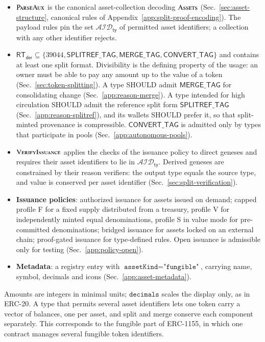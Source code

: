\begin{itemize}
	\item $\Call{ParseAux}{}$ is the canonical asset-collection decoding $\Call{Assets}{}$ (Sec.~\ref{sec:asset-structure}, canonical rules of Appendix~\ref{app:split-proof-encoding}). The payload rules pin the set $\mathcal{AID}_\mathsf{ty}$ of permitted asset identifiers; a collection with any other identifier rejects.
	\item $\mathsf{RT}_\mathsf{der} \subseteq \{39044, \mathsf{SPLITREF\_TAG}, \mathsf{MERGE\_TAG}, \mathsf{CONVERT\_TAG}\}$ and contains at least one split format. Divisibility is the defining property of the usage: an owner must be able to pay any amount up to the value of a token (Sec.~\ref{sec:token-splitting}). A type SHOULD admit $\mathsf{MERGE\_TAG}$ for consolidating change (Sec.~\ref{app:reason-merge}). A type intended for high circulation SHOULD admit the reference split form $\mathsf{SPLITREF\_TAG}$ (Sec.~\ref{app:reason-splitref}), and its wallets SHOULD prefer it, so that split-minted provenance is compressible. $\mathsf{CONVERT\_TAG}$ is admitted only by types that participate in pools (Sec.~\ref{app:autonomous-pools}).
	\item $\Call{VerifyIssuance}{}$ applies the checks of the issuance policy to direct geneses and requires their asset identifiers to lie in $\mathcal{AID}_\mathsf{ty}$. Derived geneses are constrained by their reason verifiers: the output type equals the source type, and value is conserved per asset identifier (Sec.~\ref{sec:split-verification}).
	\item \textbf{Issuance policies}: authorized issuance for assets issued on demand; capped profile F for a fixed supply distributed from a treasury, profile V for independently minted equal denominations, profile S in value mode for pre-committed denominations; bridged issuance for assets locked on an external chain; proof-gated issuance for type-defined rules. Open issuance is admissible only for testing (Sec.~\ref{app:policy-open}).
	\item \textbf{Metadata}: a registry entry with $\texttt{assetKind} = \texttt{"fungible"}$, carrying name, symbol, decimals and icons (Sec.~\ref{app:asset-metadata}).
\end{itemize}

Amounts are integers in minimal units; $\texttt{decimals}$ scales the display only, as in ERC-20. A type that permits several asset identifiers lets one token carry a vector of balances, one per asset, and split and merge conserve each component separately. This corresponds to the fungible part of ERC-1155, in which one contract manages several fungible token identifiers.

